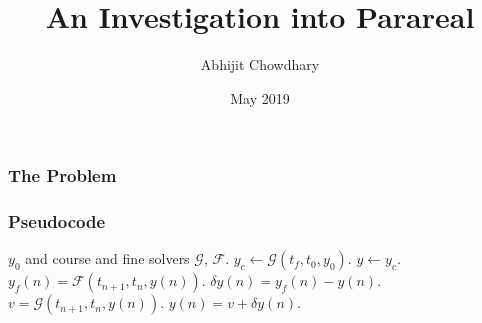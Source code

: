 \documentclass[12pt]{beamer}
\title{An Investigation into Parareal}
\author{Abhijit Chowdhary}
\institute{New York University}
\date{May 2019}
\newcommand{\course}{\mathcal{G}}
\newcommand{\fine}{\mathcal{F}}
\begin{document}
 
\frame{\titlepage}

\begin{frame}
  \frametitle{The Problem}
\end{frame}

\begin{frame}
  \frametitle{Pseudocode}
  \begin{algorithmic}
    \Require $y_0$ and course and fine solvers $\course$, $\fine$.
    \State $y_c \gets \course(t_f, t_0, y_0)$.
    \State $y \gets y_c$.
        \State $y_f(n) = \fine(t_{n+1},t_n,y(n))$.
        \State $\delta y(n) = y_f(n) - y(n)$.
      \EndFor
        \State $v = \course(t_{n+1},t_n,y(n))$.
        \State $y(n) = v + \delta y(n)$.
      \EndFor
    \EndWhile
  \end{algorithmic}
\end{frame}
\end{document}
